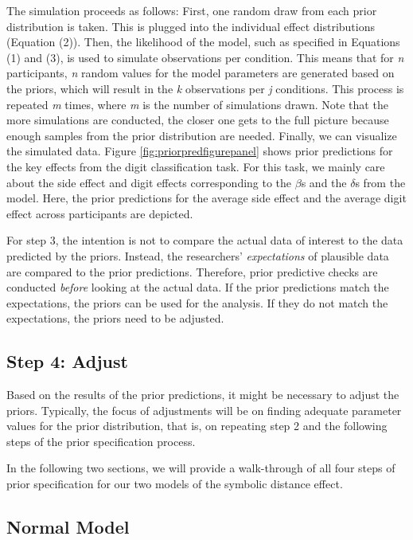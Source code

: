 \documentclass[
  english,
  doc,floatsintext]{apa6}
\begin{document}
The simulation proceeds as follows: First, one random draw from each prior distribution is taken. This is plugged into the individual effect distributions (Equation (2)). Then, the likelihood of the model, such as specified in Equations (1) and (3), is used to simulate observations per condition. This means that for \emph{n} participants, \emph{n} random values for the model parameters are generated based on the priors, which will result in the \emph{k} observations per \emph{j} conditions. This process is repeated \emph{m} times, where \emph{m} is the number of simulations drawn. Note that the more simulations are conducted, the closer one gets to the full picture because enough samples from the prior distribution are needed. Finally, we can visualize the simulated data. Figure \ref{fig:priorpredfigurepanel} shows prior predictions for the key effects from the digit classification task. For this task, we mainly care about the side effect and digit effects corresponding to the \(\beta\)s and the \(\delta\)s from the model. Here, the prior predictions for the average side effect and the average digit effect across participants are depicted.

For step 3, the intention is not to compare the actual data of interest to the data predicted by the priors. Instead, the researchers' \emph{expectations} of plausible data are compared to the prior predictions. Therefore, prior predictive checks are conducted \emph{before} looking at the actual data. If the prior predictions match the expectations, the priors can be used for the analysis. If they do not match the expectations, the priors need to be adjusted.

\hypertarget{step-4-adjust}{%
\subsection{Step 4: Adjust}\label{step-4-adjust}}

Based on the results of the prior predictions, it might be necessary to adjust the priors. Typically, the focus of adjustments will be on finding adequate parameter values for the prior distribution, that is, on repeating step 2 and the following steps of the prior specification process.

In the following two sections, we will provide a walk-through of all four steps of prior specification for our two models of the symbolic distance effect.

\hypertarget{normal-model-1}{%
\subsection{Normal Model}\label{normal-model-1}}
\end{document}
